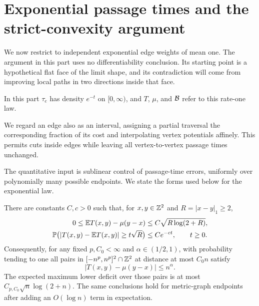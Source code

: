 \section{Exponential passage times and the strict-convexity argument}
\label{model:section}

We now restrict to independent exponential edge weights of mean one.
The argument in this part uses no differentiability conclusion. Its
starting point is a hypothetical flat face of the limit shape, and its
contradiction will come from improving local paths in two directions
inside that face.

In this part $\tau_e$ has density $e^{-t}$ on $[0,\infty)$, and
$T$, $\mu$, and $\mathcal B$ refer to this rate-one law.

We regard an edge also as an interval, assigning a partial traversal
the corresponding fraction of its cost and interpolating vertex
potentials affinely. This permits cuts inside edges while leaving all
vertex-to-vertex passage times unchanged.

The quantitative input is sublinear control of passage-time errors,
uniformly over polynomially many possible endpoints. We state the forms
used below for the exponential law.

\begin{lemma}\label{model:metric}
There are constants $C,c>0$ such that, for $x,y\in\mathbb Z^2$ and
$R=|x-y|_1\ge2$,
\begin{align}
 0\le \mathbb E T(x,y)-\mu(y-x)
     &\le C\sqrt{R\log(2+R)},\label{model:mean}\\
 \mathbb P\bigl(|T(x,y)-\mathbb E T(x,y)|\ge t\sqrt R\bigr)
     &\le C e^{-ct},\qquad t\ge0.\label{model:concentration}
\end{align}
Consequently, for any fixed $p,C_0<\infty$ and $\alpha\in(1/2,1)$,
with probability tending to one all pairs in $[-n^p,n^p]^2\cap\mathbb Z^2$
at distance at most $C_0n$ satisfy
\[
 |T(x,y)-\mu(y-x)|\le n^\alpha.
\]
The expected maximum lower deficit over those pairs is at most
$C_{p,C_0}\sqrt n\log(2+n)$. The same conclusions hold for
metric-graph endpoints after adding an $O(\log n)$ term in expectation.
\end{lemma}

